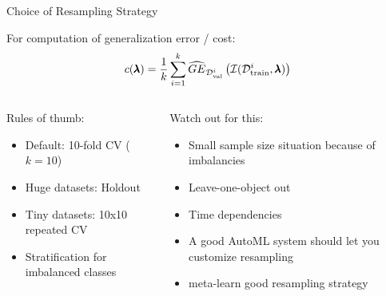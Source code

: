 \begin{frame}{Choice of Resampling Strategy}
  
  For computation of generalization error / cost:
  \begin{equation*}
    c(\pmb{\lambda}) = \frac{1}{k}\sum_{i = 1}^k \widehat{GE}_{\mathcal{D}_{\text{val}}^i}\left(\mathcal{I}(\mathcal{D}_{\text{train}}^i, \pmb{\lambda})\right)
  \end{equation*}

  \vspace{1em}
  \begin{columns}
    \begin{column}{0.5\textwidth}
    Rules of thumb:
    \begin{itemize}
      \item Default: 10-fold CV ($k=10$)
      \item Huge datasets: Holdout
      \item Tiny datasets: 10x10 repeated CV
      \item Stratification for imbalanced classes
    \end{itemize}
    \end{column}
    
    \begin{column}{0.5\textwidth}
 Watch out for this:       
    \begin{itemize}
      \item Small sample size situation because of imbalancies    
      \item Leave-one-object out
      \item Time dependencies
      \item A good AutoML system should let you customize resampling
      \item meta-learn good resampling strategy 
    \end{itemize}
    \end{column}
    \end{columns}
    
\end{frame}

